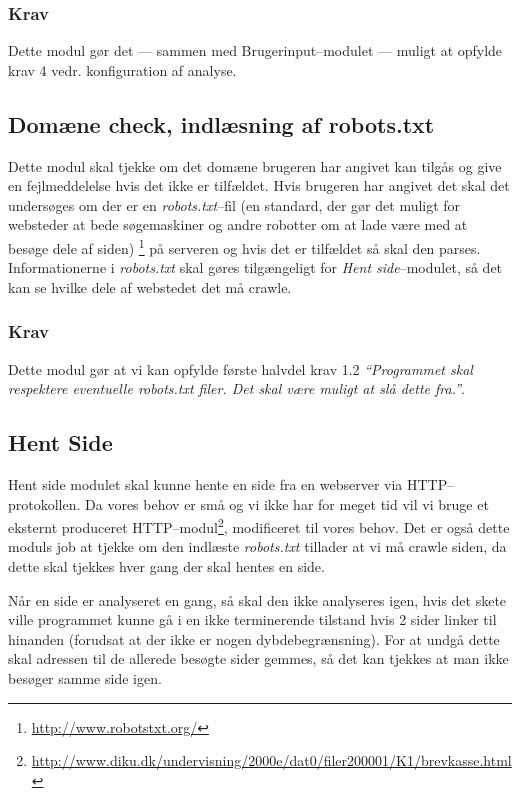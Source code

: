 \documentclass[a4paper,oneside]{memoir}
\begin{document}
\subsubsection{Krav}
Dette modul gør det --- sammen med Brugerinput--modulet --- muligt at
opfylde krav 4 vedr. konfiguration af analyse.

\subsection{Domæne check, indlæsning af robots.txt}
Dette modul skal tjekke om det domæne brugeren har angivet kan tilgås
og give en fejlmeddelelse hvis det ikke er tilfældet. Hvis brugeren
har angivet det skal det undersøges om der er en
\textit{robots.txt}--fil (en standard, der gør det muligt for websteder
at bede søgemaskiner og andre robotter om at lade være med at besøge
dele af siden) \footnote{\url{http://www.robotstxt.org/}} på serveren
og hvis det er tilfældet så skal den parses. Informationerne i
\textit{robots.txt} skal gøres tilgængeligt for \textit{Hent
  side}--modulet, så det kan se hvilke dele af webstedet det må crawle.

\subsubsection{Krav}
Dette modul gør at vi kan opfylde første halvdel krav 1.2
\textit{``Programmet skal respektere eventuelle robots.txt filer. Det
  skal være muligt at slå dette fra.''}.

\subsection{Hent Side}
Hent side modulet skal kunne hente en side fra en webserver via
HTTP--protokollen. Da vores behov er små og vi ikke har for meget tid
vil vi bruge et eksternt produceret
HTTP--modul\footnote{\url{http://www.diku.dk/undervisning/2000e/dat0/filer200001/K1/brevkasse.html}},
modificeret til vores behov. Det er også dette moduls job at tjekke om
den indlæste \textit{robots.txt} tillader at vi må crawle siden, da dette skal
tjekkes hver gang der skal hentes en side.

Når en side er analyseret en gang, så skal den ikke analyseres igen,
hvis det skete ville programmet kunne gå i en ikke terminerende
tilstand hvis 2 sider linker til hinanden (forudsat at der ikke er
nogen dybdebegrænsning). For at undgå dette skal adressen til de
allerede besøgte sider gemmes, så det kan tjekkes at man ikke besøger
samme side igen.
\end{document}
